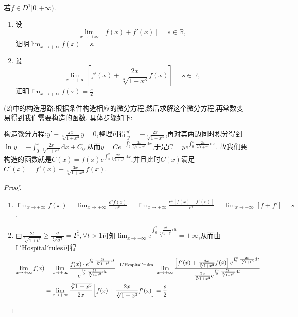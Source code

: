 \documentclass[../../main.tex]{subfiles}%
\begin{document}
\begin{example}
若\(f\in D^1[0,+\infty)\).
\begin{enumerate}[(1)]
\item 设
\[
\lim_{x\rightarrow +\infty}[f(x)+f'(x)] = s\in\mathbb{R},
\]
证明\(\lim_{x\rightarrow +\infty}f(x)=s\).

\item 设
\[
\lim_{x\rightarrow +\infty}\left[f'(x)+\frac{2x}{\sqrt[3]{1 + x^{3}}}f(x)\right]=s\in\mathbb{R},
\]
证明\(\lim_{x\rightarrow +\infty}f(x)=\frac{s}{2}\).
\end{enumerate}
\end{example}
\begin{note}
(2)中的构造思路:根据条件构造相应的微分方程,然后求解这个微分方程,再常数变易得到我们需要构造的函数. 具体步骤如下:

构造微分方程:\(y'+\frac{2x}{\sqrt[3]{1 + x^3}}y = 0\),整理可得\(\frac{y'}{y}=-\frac{2x}{\sqrt[3]{1 + x^3}}\),再对其两边同时积分得到\(\ln y = -\int_{0}^{x}\frac{2x}{\sqrt[3]{1 + x^3}}\mathrm{d}x + C_0\).从而\(y = Ce^{-\int_{0}^{x}\frac{2x}{\sqrt[3]{1 + x^3}}\mathrm{d}x}\),于是\(C = ye^{\int_{0}^{x}\frac{2x}{\sqrt[3]{1 + x^3}}\mathrm{d}x}\).
故我们要构造的函数就是\(C(x) = f(x)e^{\int_{0}^{x}\frac{2x}{\sqrt[3]{1 + x^3}}\mathrm{d}x}\).并且此时$C(x)$满足$C'\left( x \right) =f'\left( x \right) +\frac{2x}{\sqrt[3]{1+x^3}}f\left( x \right)$.
\end{note}
\begin{proof}
\begin{enumerate}[(1)]
\item $\lim_{x\rightarrow +\infty}f(x) = \lim_{x\rightarrow +\infty}\frac{e^{x}f(x)}{e^{x}}
=\lim_{x\rightarrow +\infty}\frac{e^{x}[f(x)+f'(x)]}{e^{x}}
=\lim_{x\rightarrow +\infty}[f + f']
=s$.

\item 由$\frac{2t}{\sqrt[3]{1+t^3}}\geqslant \frac{2t}{\sqrt[3]{2t^3}}=2^{\frac{2}{3}},\forall t>1$可知$\lim_{x\rightarrow +\infty} e^{\int_0^x{\frac{2t}{\sqrt[3]{1+t^3}}\mathrm{d}t}}=+\infty$,从而由$\mathrm{L}'\mathrm{Hospital}'\mathrm{rules}$可得
\begin{align*}
\lim_{x\rightarrow +\infty} f(x)&=\lim_{x\rightarrow +\infty} \frac{f(x)\cdot e^{\int_0^x{\frac{2t}{\sqrt[3]{1+t^3}}\mathrm{d}t}}}{e^{\int_0^x{\frac{2t}{\sqrt[3]{1+t^3}}\mathrm{d}t}}}\xlongequal[]{\mathrm{L}'\mathrm{Hospital}'\mathrm{rules}}\lim_{x\rightarrow +\infty} \frac{\left[ f'(x)+\frac{2x}{\sqrt[3]{1+x^3}}f(x) \right] e^{\int_0^x{\frac{2t}{\sqrt[3]{1+t^3}}\mathrm{d}t}}}{\frac{2x}{\sqrt[3]{1+x^3}}e^{\int_0^x{\frac{2t}{\sqrt[3]{1+t^3}}\mathrm{d}t}}}
\\
&=\lim_{x\rightarrow +\infty} \frac{\sqrt[3]{1+x^3}}{2x}\left[ f(x)+\frac{2x}{\sqrt[3]{1+x^3}}f'(x) \right] =\frac{s}{2}.
\end{align*}
\end{enumerate}
\end{proof}
\end{document}
